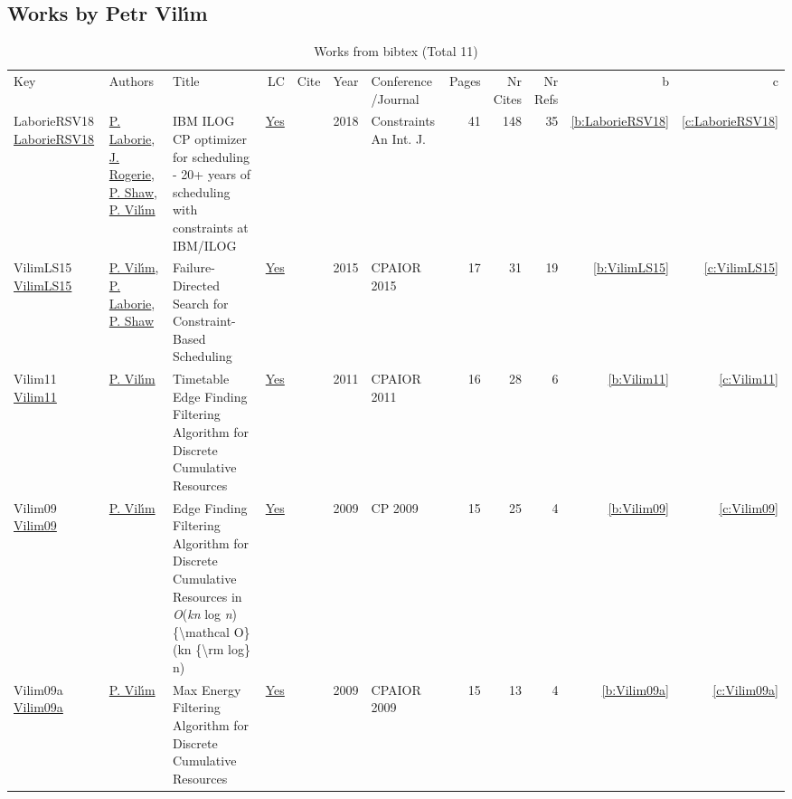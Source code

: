 \subsection{Works by Petr Vil{\'{\i}}m}
\label{sec:a121}
{\scriptsize
\begin{longtable}{>{\raggedright\arraybackslash}p{3cm}>{\raggedright\arraybackslash}p{6cm}>{\raggedright\arraybackslash}p{6.5cm}rrrp{2.5cm}rrrrr}
\rowcolor{white}\caption{Works from bibtex (Total 11)}\\ \toprule
\rowcolor{white}Key & Authors & Title & LC & Cite & Year & \shortstack{Conference\\/Journal} & Pages & \shortstack{Nr\\Cites} & \shortstack{Nr\\Refs} & b & c \\ \midrule\endhead
\bottomrule
\endfoot
LaborieRSV18 \href{https://doi.org/10.1007/s10601-018-9281-x}{LaborieRSV18} & \hyperref[auth:a118]{P. Laborie}, \hyperref[auth:a119]{J. Rogerie}, \hyperref[auth:a120]{P. Shaw}, \hyperref[auth:a121]{P. Vil{\'{\i}}m} & {IBM} {ILOG} {CP} optimizer for scheduling - 20+ years of scheduling with constraints at {IBM/ILOG} & \href{works/LaborieRSV18.pdf}{Yes} & \cite{LaborieRSV18} & 2018 & Constraints An Int. J. & 41 & 148 & 35 & \ref{b:LaborieRSV18} & \ref{c:LaborieRSV18}\\
VilimLS15 \href{https://doi.org/10.1007/978-3-319-18008-3\_30}{VilimLS15} & \hyperref[auth:a121]{P. Vil{\'{\i}}m}, \hyperref[auth:a118]{P. Laborie}, \hyperref[auth:a120]{P. Shaw} & Failure-Directed Search for Constraint-Based Scheduling & \href{works/VilimLS15.pdf}{Yes} & \cite{VilimLS15} & 2015 & CPAIOR 2015 & 17 & 31 & 19 & \ref{b:VilimLS15} & \ref{c:VilimLS15}\\
Vilim11 \href{https://doi.org/10.1007/978-3-642-21311-3\_22}{Vilim11} & \hyperref[auth:a121]{P. Vil{\'{\i}}m} & Timetable Edge Finding Filtering Algorithm for Discrete Cumulative Resources & \href{works/Vilim11.pdf}{Yes} & \cite{Vilim11} & 2011 & CPAIOR 2011 & 16 & 28 & 6 & \ref{b:Vilim11} & \ref{c:Vilim11}\\
Vilim09 \href{https://doi.org/10.1007/978-3-642-04244-7\_62}{Vilim09} & \hyperref[auth:a121]{P. Vil{\'{\i}}m} & Edge Finding Filtering Algorithm for Discrete Cumulative Resources in \emph{O}(\emph{kn} log \emph{n})\{{\textbackslash}mathcal O\}(kn \{{\textbackslash}rm log\} n) & \href{works/Vilim09.pdf}{Yes} & \cite{Vilim09} & 2009 & CP 2009 & 15 & 25 & 4 & \ref{b:Vilim09} & \ref{c:Vilim09}\\
Vilim09a \href{https://doi.org/10.1007/978-3-642-01929-6\_22}{Vilim09a} & \hyperref[auth:a121]{P. Vil{\'{\i}}m} & Max Energy Filtering Algorithm for Discrete Cumulative Resources & \href{works/Vilim09a.pdf}{Yes} & \cite{Vilim09a} & 2009 & CPAIOR 2009 & 15 & 13 & 4 & \ref{b:Vilim09a} & \ref{c:Vilim09a}\\

\end{longtable}}
